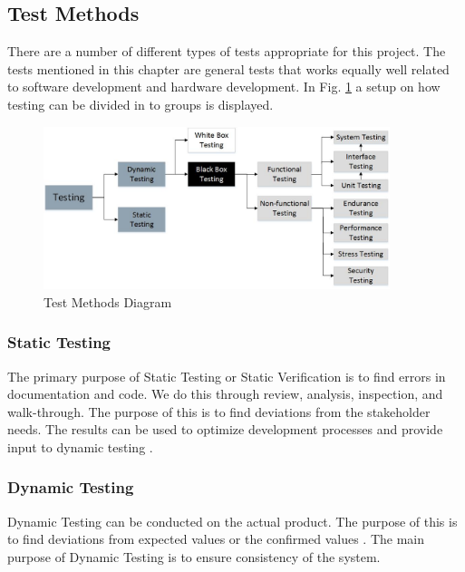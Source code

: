 \subsection{Test Methods}
There are a number of different types of tests appropriate for this project. The tests mentioned in this chapter are general tests that works equally well related to software development and hardware development. In Fig. \ref{fig:testing} a setup on how testing can be divided in to groups is displayed.

\begin{figure}[h]
    \centering
        \includegraphics[width=0.9\textwidth]{VAPIQ-PICTURES/testing}
        \caption{Test Methods Diagram}
        \label{fig:testing}
\end{figure}

\subsubsection*{Static Testing}
The primary purpose of Static Testing or Static Verification is to find errors in documentation and code. We do this through review, analysis, inspection, and walk-through. The purpose of this is to find deviations from the stakeholder needs. The results can be used to optimize development processes and provide input to dynamic testing \cite{ref3}. 

\subsubsection*{Dynamic Testing}
Dynamic Testing can be conducted on the actual product. The purpose of this is to find deviations from expected values or the confirmed values \cite{ref3}. The main purpose of Dynamic Testing is to ensure consistency of the system.
\newpage

 